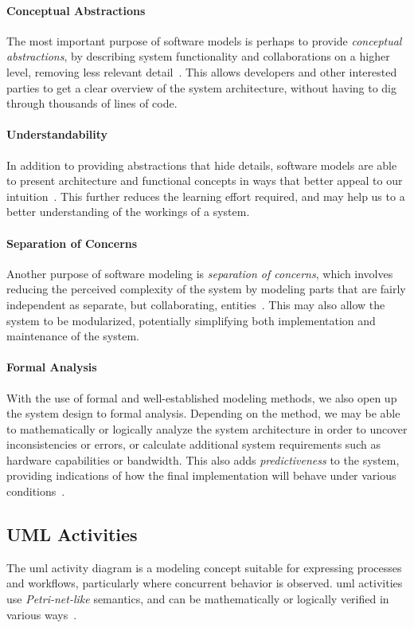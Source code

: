 \paragraph{Conceptual Abstractions} The most important purpose of software models is perhaps to provide \emph{conceptual abstractions}, by describing system functionality and collaborations on a higher level, removing less relevant detail~\cite{braek:itut_methodologies}. This allows developers and other interested parties to get a clear overview of the system architecture, without having to dig through thousands of lines of code.

\paragraph{Understandability} In addition to providing abstractions that hide details, software models are able to present architecture and functional concepts in ways that better appeal to our intuition~\cite{selic:model_driven_development}. This further reduces the learning effort required, and may help us to a better understanding of the workings of a system.

\paragraph{Separation of Concerns} Another purpose of software modeling is \emph{separation of concerns}, which involves reducing the perceived complexity of the system by modeling parts that are fairly independent as separate, but collaborating, entities~\cite{braek:itut_methodologies}. This may also allow the system to be modularized, potentially simplifying both implementation and maintenance of the system.

\paragraph{Formal Analysis} With the use of formal and well-established modeling methods, we also open up the system design to formal analysis. Depending on the method, we may be able to mathematically or logically analyze the system architecture in order to uncover inconsistencies or errors, or calculate additional system requirements such as hardware capabilities or bandwidth. This also adds \emph{predictiveness} to the system, providing indications of how the final implementation will behave under various conditions~\cite{selic:model_driven_development}.

\subsection{UML Activities}
\label{sec:uml_activities}
The \gls{uml} activity diagram is a modeling concept suitable for expressing processes and workflows, particularly where concurrent behavior is observed. \gls{uml} activities use \emph{Petri-net-like} semantics, and can be mathematically or logically verified in various ways~\cite{eshuis:uml_verification, kraemer:arctis, storrle:uml_verification}.

